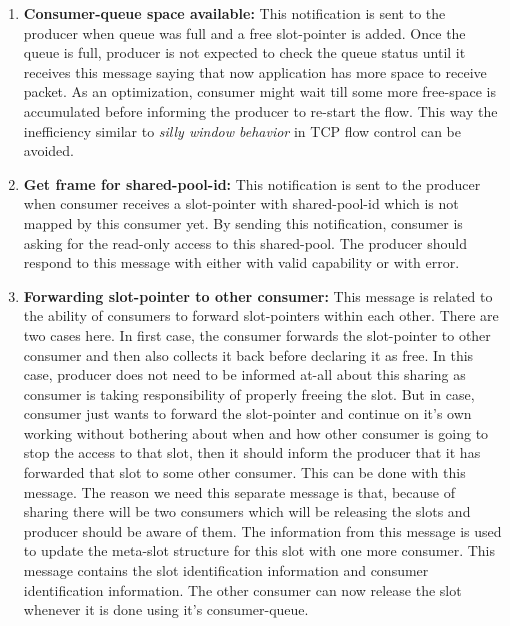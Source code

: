 \documentclass[a4paper,twoside]{report} %
\begin{document}
\begin{enumerate} 
  \item \textbf{Consumer-queue space available:} This notification is
  sent to the producer when queue was full and a free slot-pointer is
  added.  Once the queue is full, producer is not expected to check
  the queue status until it receives this message saying that now
  application has more space to receive packet.  As an optimization,
  consumer might wait till some more free-space is accumulated before
  informing the producer to re-start the flow.  This way the
  inefficiency similar to \textit{silly window behavior} in TCP 
  flow control can be avoided.

  \item \textbf{Get frame for shared-pool-id:} This notification is
  sent to the producer when consumer receives a slot-pointer with 
  shared-pool-id which is not mapped by this consumer yet.  By
  sending this notification, consumer is asking for the read-only
  access to this shared-pool.  The producer should respond to
  this message with either with valid capability or with error.

  \item \textbf{Forwarding slot-pointer to other consumer:}  
  \label{slot-forward} 
  This message is related to the ability of consumers to forward
  slot-pointers within each other.  There are two cases here.  In
  first case, the consumer forwards the slot-pointer to other 
  consumer and then also collects it back before declaring it as free.
  In this case, producer does not need to be informed at-all about
  this sharing as consumer is taking responsibility of properly
  freeing the slot.  But in case, consumer just wants to forward the
  slot-pointer and continue on it's own working without bothering
  about when and how other consumer is going to stop the access to
  that slot, then it should inform the producer that it has forwarded
  that slot to some other consumer.  This can be done with this
  message.  The reason we need this separate message is that, 
  because of sharing there will be two consumers which will be 
  releasing the slots and producer should be aware of them.  
  The information from this message is used to update the 
  meta-slot structure for this slot with one more consumer.
  This message contains the slot identification information
  and consumer identification information.  The other consumer can 
  now release the slot whenever it is done using it's consumer-queue.  



\end{enumerate}
\end{document}
